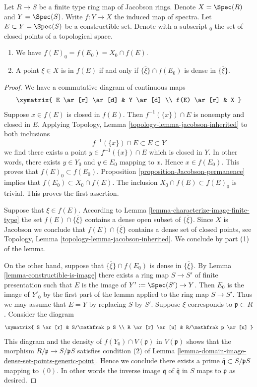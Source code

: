 \begin{lemma}
\label{lemma-image-finite-type-map-Jacobson-rings}
Let $R \to S$ be a finite type ring map of Jacobson rings.
Denote $X = \Spec(R)$ and $Y = \Spec(S)$.
Write $f : Y \to X$ the induced
map of spectra. Let $E \subset Y = \Spec(S)$ be a
constructible set. Denote with a subscript ${}_0$ the set
of closed points of a topological space.
\begin{enumerate}
\item We have $f(E)_0 = f(E_0) = X_0 \cap f(E)$.
\item A point $\xi \in X$ is in $f(E)$ if and only if
$\overline{\{\xi\}} \cap f(E_0)$ is dense in $\overline{\{\xi\}}$.
\end{enumerate}
\end{lemma}

\begin{proof}
We have a commutative diagram of continuous maps
$$
\xymatrix{
E \ar[r] \ar[d] & Y \ar[d] \\
f(E) \ar[r] & X
}
$$
Suppose $x \in f(E)$ is closed in $f(E)$. Then $f^{-1}(\{x\})\cap E$
is nonempty and closed in $E$. Applying
Topology, Lemma \ref{topology-lemma-jacobson-inherited}
to both inclusions
$$
f^{-1}(\{x\}) \cap E \subset E \subset Y
$$
we find there exists a point $y \in f^{-1}(\{x\}) \cap E$ which is
closed in $Y$. In other words, there exists $y \in Y_0$ and $y \in E_0$
mapping to $x$. Hence $x \in f(E_0)$.
This proves that $f(E)_0 \subset f(E_0)$.
Proposition \ref{proposition-Jacobson-permanence} implies that
$f(E_0) \subset X_0 \cap f(E)$. The inclusion
$X_0 \cap f(E) \subset f(E)_0$ is trivial. This proves the
first assertion.

\medskip\noindent
Suppose that $\xi \in f(E)$. According to
Lemma \ref{lemma-characterize-image-finite-type}
the set $f(E) \cap \overline{\{\xi\}}$ contains a dense
open subset of $\overline{\{\xi\}}$. Since $X$ is Jacobson
we conclude that $f(E) \cap \overline{\{\xi\}}$ contains a
dense set of closed points, see Topology,
Lemma \ref{topology-lemma-jacobson-inherited}.
We conclude by part (1) of the lemma.

\medskip\noindent
On the other hand, suppose that $\overline{\{\xi\}} \cap f(E_0)$
is dense in $\overline{\{\xi\}}$. By
Lemma \ref{lemma-constructible-is-image}
there exists a ring map $S \to S'$ of finite presentation
such that $E$ is the image of $Y' := \Spec(S') \to Y$.
Then $E_0$ is the image of $Y'_0$ by the first part of the
lemma applied to the ring map $S \to S'$. Thus we may assume that
$E = Y$ by replacing $S$ by $S'$. Suppose $\xi$ corresponds
to $\mathfrak p \subset R$. Consider the diagram
$$
\xymatrix{
S \ar[r] & S/\mathfrak p S \\
R \ar[r] \ar[u] & R/\mathfrak p \ar[u]
}
$$
This diagram and the density of $f(Y_0) \cap V(\mathfrak p)$
in $V(\mathfrak p)$
shows that the morphism $R/\mathfrak p \to S/\mathfrak p S$
satisfies condition (2) of
Lemma \ref{lemma-domain-image-dense-set-points-generic-point}.
Hence we conclude
there exists a prime $\overline{\mathfrak q} \subset S/\mathfrak pS$
mapping to $(0)$. In other words the inverse image $\mathfrak q$
of $\overline{\mathfrak q}$ in $S$ maps to $\mathfrak p$ as desired.
\end{proof}